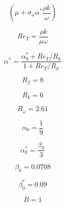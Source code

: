 \begin{equation}
\left(\mu + \sigma_{\omega} \alpha^* \frac{\rho k}{\omega} \right)
\end{equation}

\begin{equation}
Re_T = \frac{\rho k}{\mu \omega}
\end{equation}

\begin{equation}
\alpha^* = \frac{\alpha_0^* + Re_T/R_k}{1 + Re_T/R_k}
\end{equation}

\begin{equation}
R_{\beta} = 8
\end{equation}

\begin{equation}
R_k = 6
\end{equation}

\begin{equation}
R_{\omega} = 2.61
\end{equation}

\begin{equation}
\alpha_0 = \frac{1}{9}
\end{equation}

\begin{equation}
\alpha_0^* = \frac{\beta_0}{3}
\end{equation}

\begin{equation}
\beta_0 = 0.0708
\end{equation}

\begin{equation}
\beta_0^* = 0.09
\end{equation}

\begin{equation}
B=1
\end{equation}


